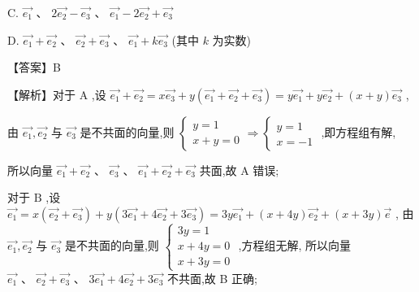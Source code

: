 \documentclass[10pt]{article}
\begin{document}
C. \(\overrightarrow{{e}_{1}}\text{ 、 }2\overrightarrow{{e}_{2}} - \overrightarrow{{e}_{3}}\text{ 、 }\overrightarrow{{e}_{1}} - 2\overrightarrow{{e}_{2}} + \overrightarrow{{e}_{3}}\)

D. \(\overrightarrow{{e}_{1}} + \overrightarrow{{e}_{2}}\text{ 、 }\overrightarrow{{e}_{2}} + \overrightarrow{{e}_{3}}\text{ 、 }\overrightarrow{{e}_{1}} + k\overrightarrow{{e}_{3}}\) (其中 \(k\) 为实数)

【答案】B

【解析】对于 \(\mathrm{A}\) ,设 \(\overrightarrow{{e}_{1}} + \overrightarrow{{e}_{2}} = x\overrightarrow{{e}_{3}} + y\left( {\overrightarrow{{e}_{1}} + \overrightarrow{{e}_{2}} + \overrightarrow{{e}_{3}}}\right)  = y\overrightarrow{{e}_{1}} + y\overrightarrow{{e}_{2}} + \left( {x + y}\right) \overrightarrow{{e}_{3}}\) ,

由 \(\overrightarrow{{e}_{1}},\overrightarrow{{e}_{2}}\) 与 \(\overrightarrow{{e}_{3}}\) 是不共面的向量,则 \(\left\{  {\begin{array}{l} y = 1 \\  x + y = 0 \end{array} \Rightarrow  \left\{  \begin{array}{l} y = 1 \\  x =  - 1 \end{array}\right. }\right.\) ,即方程组有解,

所以向量 \(\overrightarrow{{e}_{1}} + \overrightarrow{{e}_{2}}\text{ 、 }\overrightarrow{{e}_{3}}\text{ 、 }\overrightarrow{{e}_{1}} + \overrightarrow{{e}_{2}} + \overrightarrow{{e}_{3}}\) 共面,故 A 错误;

对于 \(\mathrm{B}\) ,设 \(\overrightarrow{{e}_{1}} = x\left( {\overrightarrow{{e}_{2}} + \overrightarrow{{e}_{3}}}\right)  + y\left( {3\overrightarrow{{e}_{1}} + 4\overrightarrow{{e}_{2}} + 3\overrightarrow{{e}_{3}}}\right)  = {3y}\overrightarrow{{e}_{1}} + \left( {x + {4y}}\right) \overrightarrow{{e}_{2}} + \left( {x + {3y}}\right) \overrightarrow{e}\) , 由 \(\overrightarrow{{e}_{1}},\overrightarrow{{e}_{2}}\) 与 \(\overrightarrow{{e}_{3}}\) 是不共面的向量,则 \(\left\{  \begin{array}{l} {3y} = 1 \\  x + {4y} = 0 \\  x + {3y} = 0 \end{array}\right.\) ,方程组无解, 所以向量 \(\overrightarrow{{e}_{1}}\text{ 、 }\overrightarrow{{e}_{2}} + \overrightarrow{{e}_{3}}\text{ 、 }3\overrightarrow{{e}_{1}} + 4\overrightarrow{{e}_{2}} + 3\overrightarrow{{e}_{3}}\) 不共面,故 B 正确;
\end{document}
